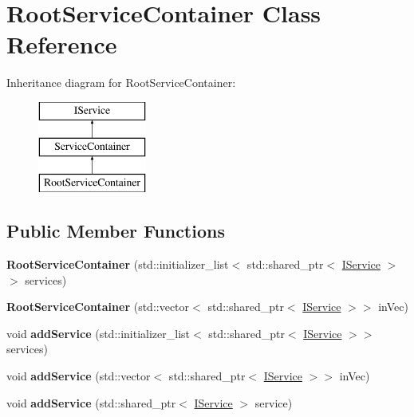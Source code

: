 \hypertarget{classRootServiceContainer}{}\section{Root\+Service\+Container Class Reference}
\label{classRootServiceContainer}
Inheritance diagram for Root\+Service\+Container\+:\begin{figure}[H]
\begin{center}
\leavevmode
\includegraphics[height=3.000000cm]{classRootServiceContainer}
\end{center}
\end{figure}
\subsection*{Public Member Functions}
\begin{DoxyCompactItemize}
\item 
{\bfseries Root\+Service\+Container} (std\+::initializer\+\_\+list$<$ std\+::shared\+\_\+ptr$<$ \hyperlink{classIService}{I\+Service} $>$$>$ services)\hypertarget{classRootServiceContainer_a74e725af7768a045ca12d4d3b55d2d43}{}\label{classRootServiceContainer_a74e725af7768a045ca12d4d3b55d2d43}

\item 
{\bfseries Root\+Service\+Container} (std\+::vector$<$ std\+::shared\+\_\+ptr$<$ \hyperlink{classIService}{I\+Service} $>$$>$ in\+Vec)\hypertarget{classRootServiceContainer_a2122fb39cb5a0d73ad484551f69f4a3a}{}\label{classRootServiceContainer_a2122fb39cb5a0d73ad484551f69f4a3a}

\item 
void {\bfseries add\+Service} (std\+::initializer\+\_\+list$<$ std\+::shared\+\_\+ptr$<$ \hyperlink{classIService}{I\+Service} $>$$>$ services)\hypertarget{classRootServiceContainer_ab09679bb51d9bd674066cdca3f3a0e2d}{}\label{classRootServiceContainer_ab09679bb51d9bd674066cdca3f3a0e2d}

\item 
void {\bfseries add\+Service} (std\+::vector$<$ std\+::shared\+\_\+ptr$<$ \hyperlink{classIService}{I\+Service} $>$$>$ in\+Vec)\hypertarget{classRootServiceContainer_a105ec6e03cf16589727406d600db44be}{}\label{classRootServiceContainer_a105ec6e03cf16589727406d600db44be}

\item 
void {\bfseries add\+Service} (std\+::shared\+\_\+ptr$<$ \hyperlink{classIService}{I\+Service} $>$ service)\hypertarget{classRootServiceContainer_a0408beff5672bc4ff95c14e630552c69}{}\label{classRootServiceContainer_a0408beff5672bc4ff95c14e630552c69}

\end{DoxyCompactItemize}
